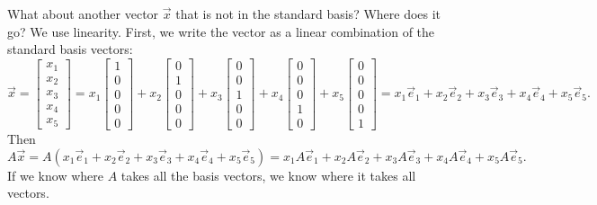 What about another vector $\vec{x}$ that is not in the standard basis?
Where does it go?  We use
linearity.  First, we write the vector as a linear combination of the standard
basis vectors:
\begin{equation*}
\vec{x} =
\begin{bmatrix}
x_1 \\ x_2 \\ x_3 \\ x_4 \\ x_5
\end{bmatrix}
=
x_1
\begin{bmatrix}
1 \\ 0 \\ 0 \\ 0 \\ 0
\end{bmatrix}
+
x_2
\begin{bmatrix}
0 \\ 1 \\ 0 \\ 0 \\ 0
\end{bmatrix}
+
x_3
\begin{bmatrix}
0 \\ 0 \\ 1 \\ 0 \\ 0
\end{bmatrix}
+
x_4
\begin{bmatrix}
0 \\ 0 \\ 0 \\ 1 \\ 0
\end{bmatrix}
+
x_5
\begin{bmatrix}
0 \\ 0 \\ 0 \\ 0 \\ 1
\end{bmatrix}
=
x_1 \vec{e}_1 + 
x_2 \vec{e}_2 + 
x_3 \vec{e}_3 + 
x_4 \vec{e}_4 + 
x_5 \vec{e}_5 .
\end{equation*}
Then
\begin{equation*}
A \vec{x}
=
A ( 
x_1 \vec{e}_1 + 
x_2 \vec{e}_2 + 
x_3 \vec{e}_3 + 
x_4 \vec{e}_4 + 
x_5 \vec{e}_5 
)
=
x_1 A\vec{e}_1 + 
x_2 A\vec{e}_2 + 
x_3 A\vec{e}_3 + 
x_4 A\vec{e}_4 + 
x_5 A\vec{e}_5 .
\end{equation*}
If we know where $A$ takes all the basis vectors, we know where it takes
all vectors.


